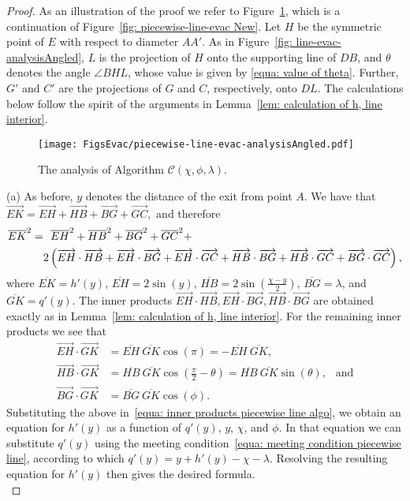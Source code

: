 \documentclass[
final
]{dmtcs-episciences}
\newcommand{\barr}[1]{\overline{#1}}
\newcommand{\vect}[1]{\overrightarrow{#1}}
\newcommand{\sinn}[1]{\sin \left({#1}\right)}
\newcommand{\coss}[1]{\cos \left({#1}\right)}
\theoremstyle{definition}
\begin{document}
\begin{proof}
As an illustration of the proof we refer to Figure~\ref{fig: piecewise-line-evac-analysisAngled}, which is a continuation of Figure~\ref{fig: piecewise-line-evac New}. Let $H$ be the symmetric point of $E$ with respect to diameter $AA'$. As in Figure~\ref{fig: line-evac-analysisAngled}, $L$ is the projection of $H$ onto the supporting line of $DB$, and $\theta$ denotes the angle $\angle{BHL}$, whose value is given by \eqref{equa: value of theta}. Further, $G'$ and $C'$ are the projections of $G$ and $C$, respectively, onto $DL$. The calculations below follow the spirit of the arguments in Lemma~\ref{lem: calculation of h, line interior}. 
\begin{figure}[!ht]
                \centering
                \texttt{[image: FigsEvac/piecewise-line-evac-analysisAngled.pdf]}
                \caption{The analysis of Algorithm $\mathcal C (\chi, \phi, \lambda)$.}
                \label{fig: piecewise-line-evac-analysisAngled}
\end{figure}

(a) As before, $y$ denotes the distance of the exit from point $A$. We have that 
$
\vect{EK}=\vect{EH}+\vect{HB}+\vect{BG}+\vect{GC},
$
and therefore
\begin{align}
\barr{EK}^2
= & ~~ \barr{EH}^2+\barr{HB}^2+\barr{BG}^2  + \barr{GC}^2 +  \notag \\
&
 2\left(
\vect{EH}\cdot\vect{HB}+
\vect{EH}\cdot\vect{BG}+
\vect{EH}\cdot\vect{GC}+
\vect{HB}\cdot\vect{BG}+
\vect{HB}\cdot\vect{GC}+
\vect{BG}\cdot\vect{GC}
\right), 
\label{equa: inner products piecewise line algo}
\end{align}
where
$\barr{EK}=h'(y)$, $\barr{EH}=2\sinn{y}$, $\barr{HB}= 2\sinn{\frac{\chi-y}2}$, $\barr{BG}=\lambda$, and $\barr{GK}=q'(y)$. The inner products $\vect{EH}\cdot\vect{HB}, \vect{EH}\cdot\vect{BG}, \vect{HB}\cdot\vect{BG}$ are obtained exactly as in Lemma~\ref{lem: calculation of h, line interior}. For the remaining inner products we see that 
\begin{align*}
\vect{EH}\cdot\vect{GK} &= 
\barr{EH} ~\barr{GK} \coss{\pi}
=- \barr{EH} ~\barr{GK},
\\
\vect{HB}\cdot\vect{GK} &=
\barr{HB} ~\barr{GK} \coss{\frac\pi2-\theta}
=\barr{HB} ~\barr{GK} \sinn{\theta}, \ \ \mbox{ and}
\\
\vect{BG}\cdot\vect{GK} &=
\barr{BG} ~\barr{GK} \coss{\phi}.
\end{align*}
Substituting the above in~\eqref{equa: inner products piecewise line algo}, we obtain an equation for $h'(y)$ as a function of
$q'(y)$, $y$, $\chi$, and $\phi$. In that equation we can substitute $q'(y)$ using the meeting condition~\eqref{equa: meeting condition piecewise line}, according to which $q'(y)=y+h'(y)-\chi-\lambda$. 
Resolving the resulting equation for $h'(y)$ then gives the desired formula. \\


\end{proof}
\end{document}
